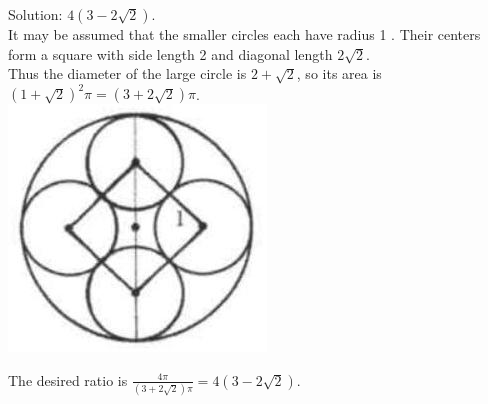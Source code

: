 \documentclass{article}
\begin{document}
Solution: \(4(3-2 \sqrt{2})\).\\
It may be assumed that the smaller circles each have radius 1 . Their centers form a square with side length 2 and diagonal length \(2 \sqrt{2}\).\\
Thus the diameter of the large circle is \(2+\sqrt{2}\), so its area is \((1+\sqrt{2})^{2} \pi=(3+2 \sqrt{2}) \pi\).\\
\centering
\includegraphics[width=\textwidth]{images/reasoning_image_1.jpg}


The desired ratio is \(\frac{4 \pi}{(3+2 \sqrt{2}) \pi}=4(3-2 \sqrt{2})\).
\end{document}
